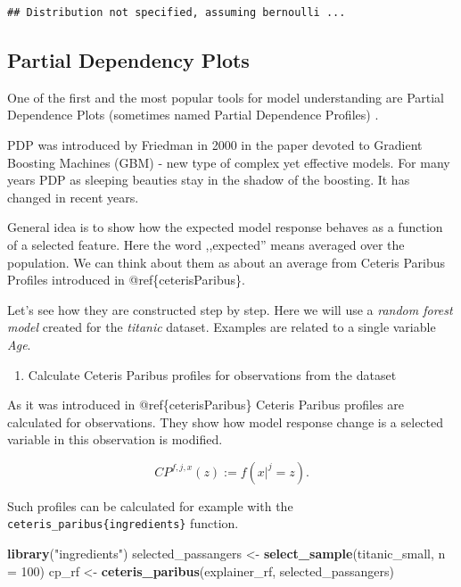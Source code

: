 \documentclass[]{krantz}
\newenvironment{Shaded}{\begin{snugshade}}{\end{snugshade}}
\newcommand{\DataTypeTok}[1]{\textcolor[rgb]{0.13,0.29,0.53}{#1}}
\newcommand{\DecValTok}[1]{\textcolor[rgb]{0.00,0.00,0.81}{#1}}
\newcommand{\KeywordTok}[1]{\textcolor[rgb]{0.13,0.29,0.53}{\textbf{#1}}}
\newcommand{\NormalTok}[1]{#1}
\newcommand{\StringTok}[1]{\textcolor[rgb]{0.31,0.60,0.02}{#1}}
\providecommand{\tightlist}{%
  \setlength{\itemsep}{0pt}\setlength{\parskip}{0pt}}
\theoremstyle{definition}
\theoremstyle{definition}
\theoremstyle{definition}
\theoremstyle{remark}
\begin{document}
\begin{verbatim}
## Distribution not specified, assuming bernoulli ...
\end{verbatim}

\hypertarget{partialDependence}{%
\subsection{Partial Dependency Plots}\label{partialDependence}}

One of the first and the most popular tools for model understanding are
Partial Dependence Plots (sometimes named Partial Dependence Profiles)
\citep{Friedman00greedyfunction}.

PDP was introduced by Friedman in 2000 in the paper devoted to Gradient
Boosting Machines (GBM) - new type of complex yet effective models. For
many years PDP as sleeping beauties stay in the shadow of the boosting.
It has changed in recent years.

General idea is to show how the expected model response behaves as a
function of a selected feature. Here the word ,,expected'' means
averaged over the population. We can think about them as about an
average from Ceteris Paribus Profiles introduced in
@ref\{ceterisParibus\}.

Let's see how they are constructed step by step. Here we will use a
\emph{random forest model} created for the \emph{titanic} dataset.
Examples are related to a single variable \emph{Age}.

\begin{enumerate}
\def\labelenumi{\arabic{enumi}.}
\tightlist
\item
  Calculate Ceteris Paribus profiles for observations from the dataset
\end{enumerate}

As it was introduced in @ref\{ceterisParibus\} Ceteris Paribus profiles
are calculated for observations. They show how model response change is
a selected variable in this observation is modified.

\[
CP^{f, j, x}(z) := f(x|^j = z).
\]

Such profiles can be calculated for example with the
\texttt{ceteris\_paribus\{ingredients\}} function.

\begin{Shaded}
\begin{Highlighting}[]
\KeywordTok{library}\NormalTok{(}\StringTok{"ingredients"}\NormalTok{)}
\NormalTok{selected_passangers <-}\StringTok{ }\KeywordTok{select_sample}\NormalTok{(titanic_small, }\DataTypeTok{n =} \DecValTok{100}\NormalTok{)}
\NormalTok{cp_rf <-}\StringTok{ }\KeywordTok{ceteris_paribus}\NormalTok{(explainer_rf, selected_passangers)}
\end{Highlighting}
\end{Shaded}
\end{document}
